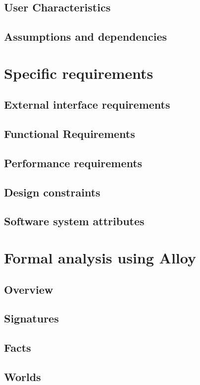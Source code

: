   \section{User Characteristics}
  
  \section{Assumptions and dependencies}
  
  
  \chapter{Specific requirements}
  \section{External interface requirements}
  
  \section{Functional Requirements}
  
  \section{Performance requirements}
  
  \section{Design constraints}
  
  \section{Software system attributes}
  

  \chapter{Formal analysis using Alloy}
  \section{Overview}
  
  \section{Signatures}
  
  \section{Facts}
  
  \section{Worlds}
  
  
  

